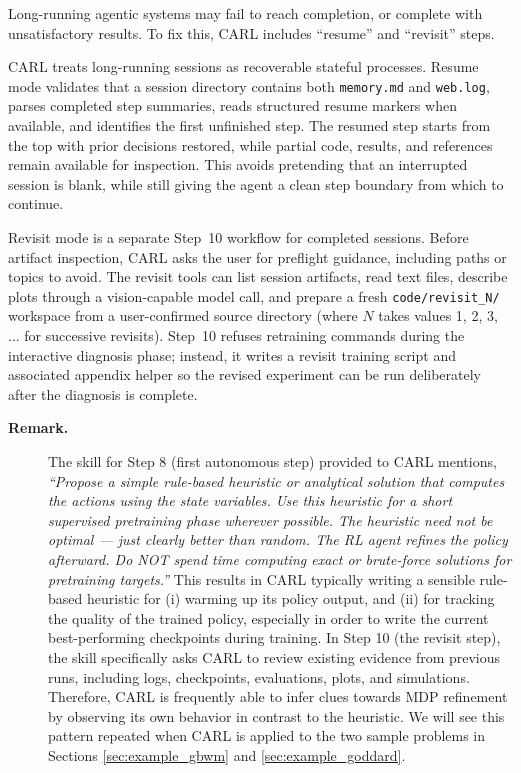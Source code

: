 \documentclass[mnsc,sglanonrev]{informs4}
\begin{document}
Long-running agentic systems may fail to reach completion, or complete with unsatisfactory results. To fix this, CARL includes ``resume'' and ``revisit'' steps.

CARL treats long-running sessions as recoverable stateful processes. Resume mode validates that a session directory contains both \texttt{memory.md} and \texttt{web.log}, parses completed step summaries, reads structured resume markers when available, and identifies the first unfinished step. The resumed step starts from the top with prior decisions restored, while partial code, results, and references remain available for inspection. This avoids pretending that an interrupted session is blank, while still giving the agent a clean step boundary from which to continue.

Revisit mode is a separate Step~10 workflow for completed sessions. Before artifact inspection, CARL asks the user for preflight guidance, including paths or topics to avoid. The revisit tools can list session artifacts, read text files, describe plots through a vision-capable model call, and prepare a fresh \texttt{code/revisit\_N/} workspace from a user-confirmed source directory (where $N$ takes values 1, 2, 3, ... for successive revisits). Step~10 refuses retraining commands during the interactive diagnosis phase; instead, it writes a revisit training script and associated appendix helper so the revised experiment can be run deliberately after the diagnosis is complete.

\begin{description}
    \item[\textbf{Remark.}] The skill for Step 8 (first autonomous step) provided to CARL mentions, \emph{``Propose a simple rule-based heuristic or analytical solution that computes the actions using the state variables. Use this heuristic for a short supervised pretraining phase wherever possible. The heuristic need not be optimal — just clearly better than random. The RL agent refines the policy afterward. Do NOT spend time computing exact or brute-force solutions for pretraining targets.''} This results in CARL typically writing a sensible rule-based heuristic for (i) warming up its policy output, and (ii) for tracking the quality of the trained policy, especially in order to write the current best-performing checkpoints during training. In Step 10 (the revisit step), the skill specifically asks CARL to review existing evidence from previous runs, including logs, checkpoints, evaluations, plots, and simulations. Therefore, CARL is frequently able to infer clues towards MDP refinement by observing its own behavior in contrast to the heuristic. We will see this pattern repeated when CARL is applied to the two sample problems in Sections \ref{sec:example_gbwm} and \ref{sec:example_goddard}.
\end{description}
\end{document}

